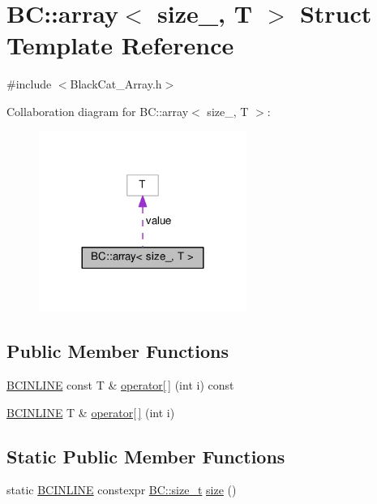 \hypertarget{structBC_1_1array}{}\section{BC\+:\+:array$<$ size\+\_\+, T $>$ Struct Template Reference}
\label{structBC_1_1array}


{\ttfamily \#include $<$Black\+Cat\+\_\+\+Array.\+h$>$}



Collaboration diagram for BC\+:\+:array$<$ size\+\_\+, T $>$\+:
\nopagebreak
\begin{figure}[H]
\begin{center}
\leavevmode
\includegraphics[width=192pt]{structBC_1_1array__coll__graph}
\end{center}
\end{figure}
\subsection*{Public Member Functions}
\begin{DoxyCompactItemize}
\item 
\hyperlink{BlackCat__Common_8h_a6699e8b0449da5c0fafb878e59c1d4b1}{B\+C\+I\+N\+L\+I\+NE} const T \& \hyperlink{structBC_1_1array_a14d7b68b018fb4870fbc565343e48b91}{operator\mbox{[}$\,$\mbox{]}} (int i) const 
\item 
\hyperlink{BlackCat__Common_8h_a6699e8b0449da5c0fafb878e59c1d4b1}{B\+C\+I\+N\+L\+I\+NE} T \& \hyperlink{structBC_1_1array_a3c52861cbdd5936cbcdbdd416360d7da}{operator\mbox{[}$\,$\mbox{]}} (int i)
\end{DoxyCompactItemize}
\subsection*{Static Public Member Functions}
\begin{DoxyCompactItemize}
\item 
static \hyperlink{BlackCat__Common_8h_a6699e8b0449da5c0fafb878e59c1d4b1}{B\+C\+I\+N\+L\+I\+NE} constexpr \hyperlink{namespaceBC_a6007cbc4eeec401a037b558910a56173}{B\+C\+::size\+\_\+t} \hyperlink{structBC_1_1array_ac248495d83c0608e10119a279f4f475e}{size} ()
\end{DoxyCompactItemize}
